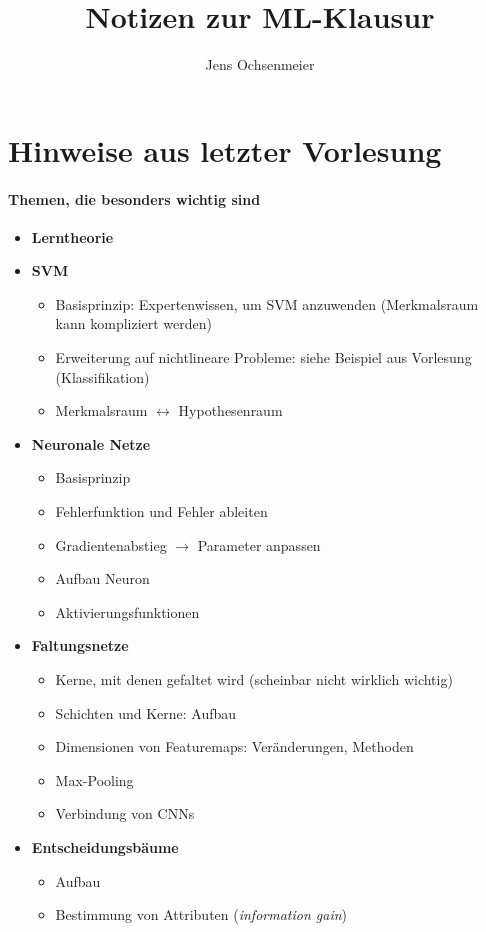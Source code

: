 \documentclass[fleqn]{latex-classes/summary}
\title{Notizen zur ML-Klausur}
\author{Jens Ochsenmeier}
\begin{document}
\section*{Hinweise aus letzter Vorlesung}

\paragraph{Themen, die besonders wichtig sind}

\begin{itemize}
  \item \textbf{Lerntheorie}
  \item \textbf{SVM}
  \begin{itemize}
    \item Basisprinzip: Expertenwissen, um SVM anzuwenden (Merkmalsraum kann kompliziert werden)
    \item Erweiterung auf nichtlineare Probleme: siehe Beispiel aus Vorlesung (Klassifikation)
    \item Merkmalsraum \( \leftrightarrow \) Hypothesenraum
  \end{itemize}
  \item \textbf{Neuronale Netze}
  \begin{itemize}
    \item Basisprinzip
    \item Fehlerfunktion und Fehler ableiten
    \item Gradientenabstieg \( \to \) Parameter anpassen
    \item Aufbau Neuron
    \item Aktivierungsfunktionen
  \end{itemize}
  \item \textbf{Faltungsnetze}
  \begin{itemize}
    \item Kerne, mit denen gefaltet wird (scheinbar nicht wirklich wichtig)
    \item Schichten und Kerne: Aufbau
    \item Dimensionen von Featuremaps: Veränderungen, Methoden
    \item Max-Pooling
    \item Verbindung von CNNs
  \end{itemize}
  \item \textbf{Entscheidungsbäume}
  \begin{itemize}
    \item Aufbau
    \item Bestimmung von Attributen (\emph{information gain})

\end{itemize}
\end{itemize}
\end{document}
